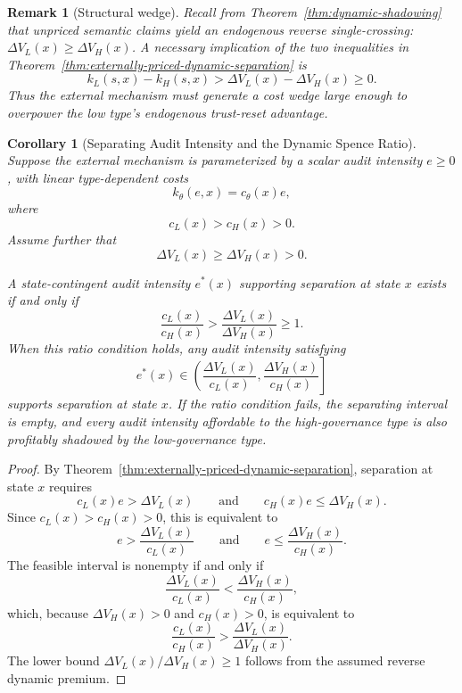 \documentclass[preprint,authoryear]{elsarticle}
\newtheorem{corollary}{Corollary}
\newtheorem{remark}{Remark}
\theoremstyle{definition}
\theoremstyle{plain}
\begin{document}
\begin{remark}[Structural wedge]
\label{rem:dynamic-structural-wedge}
Recall from Theorem~\ref{thm:dynamic-shadowing} that unpriced semantic claims
yield an endogenous reverse single-crossing: $\Delta V_L(x)\ge\Delta V_H(x)$.
A necessary implication of the two inequalities in
Theorem~\ref{thm:externally-priced-dynamic-separation} is
\[
k_L(s,x)-k_H(s,x)
>
\Delta V_L(x)-\Delta V_H(x)\ge 0.
\]
Thus the external mechanism must generate a cost wedge large enough to
overpower the low type's endogenous trust-reset advantage.
\end{remark}

\begin{corollary}[Separating Audit Intensity and the Dynamic Spence Ratio]
\label{cor:dynamic-spence-ratio}
Suppose the external mechanism is parameterized by a scalar audit intensity
$e\ge 0$, with linear type-dependent costs
\[
k_\theta(e,x)=c_\theta(x)e,
\]
where
\[
c_L(x)>c_H(x)>0.
\]
Assume further that
\[
\Delta V_L(x)\ge \Delta V_H(x)>0.
\]

A state-contingent audit intensity $e^*(x)$ supporting separation at state
$x$ exists if and only if
\[
\frac{c_L(x)}{c_H(x)}
>
\frac{\Delta V_L(x)}{\Delta V_H(x)}
\ge 1.
\]
When this ratio condition holds, any audit intensity satisfying
\[
e^*(x)\in
\left(
\frac{\Delta V_L(x)}{c_L(x)},
\frac{\Delta V_H(x)}{c_H(x)}
\right]
\]
supports separation at state $x$. If the ratio condition fails, the
separating interval is empty, and every audit intensity affordable to the
high-governance type is also profitably shadowed by the low-governance type.
\end{corollary}
\begin{proof}
By Theorem~\ref{thm:externally-priced-dynamic-separation}, separation at
state $x$ requires
\[
c_L(x)e>\Delta V_L(x)
\qquad\text{and}\qquad
c_H(x)e\le\Delta V_H(x).
\]
Since $c_L(x)>c_H(x)>0$, this is equivalent to
\[
e>
\frac{\Delta V_L(x)}{c_L(x)}
\qquad\text{and}\qquad
e\le
\frac{\Delta V_H(x)}{c_H(x)}.
\]
The feasible interval is nonempty if and only if
\[
\frac{\Delta V_L(x)}{c_L(x)}
<
\frac{\Delta V_H(x)}{c_H(x)},
\]
which, because $\Delta V_H(x)>0$ and $c_H(x)>0$, is equivalent to
\[
\frac{c_L(x)}{c_H(x)}
>
\frac{\Delta V_L(x)}{\Delta V_H(x)}.
\]
The lower bound $\Delta V_L(x)/\Delta V_H(x)\ge1$ follows from the assumed
reverse dynamic premium.
\end{proof}
\end{document}
